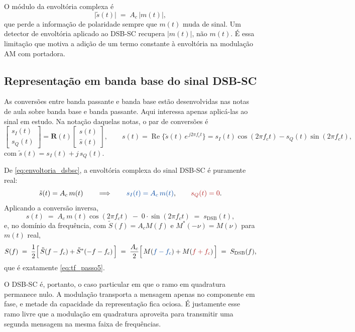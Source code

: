 \documentclass[11pt,a4paper]{article}
\newcommand{\DSB}{\text{DSB}}
\begin{document}
\begin{observacao}
O módulo da envoltória complexa é
\[
  \bigl|\tilde{s}(t)\bigr| \;=\; A_c\,\bigl|m(t)\bigr| ,
\]
que perde a informação de polaridade sempre que $m(t)$ muda de sinal. Um detector de envoltória aplicado ao DSB-SC recupera $|m(t)|$, não $m(t)$. É essa limitação que motiva a adição de um termo constante à envoltória na modulação AM com portadora.
\end{observacao}


\subsection{Representação em banda base do sinal DSB-SC}

As conversões entre banda passante e banda base estão desenvolvidas nas notas de aula sobre banda base e banda passante. Aqui interessa apenas aplicá-las ao sinal em estudo. Na notação daquelas notas, o par de conversões é
\begin{equation}
  \begin{bmatrix} s_I(t) \\[0.3em] s_Q(t) \end{bmatrix}
  = \mathbf{R}(t)\begin{bmatrix} s(t) \\[0.3em] \hat{s}(t) \end{bmatrix},
  \qquad
  s(t) = \operatorname{Re}\bigl\{\tilde{s}(t)\,e^{\,j2\pi f_c t}\bigr\}
       = s_I(t)\cos(2\pi f_c t) - s_Q(t)\sin(2\pi f_c t),
  \label{eq:conversoes_ref}
\end{equation}
com $\tilde{s}(t) = s_I(t) + j\,s_Q(t)$.

\begin{quadro}
De \eqref{eq:envoltoria_dsbsc}, a envoltória complexa do sinal DSB-SC é puramente real:
\[
  \tilde{s}(t) = A_c\, m(t)
  \qquad\Longrightarrow\qquad
  \textcolor{azul}{s_I(t) = A_c\, m(t)}, \qquad \textcolor{vermelho}{s_Q(t) = 0} .
\]
Aplicando a conversão inversa,
\[
  s(t) \;=\; A_c\, m(t)\cos(2\pi f_c t) \;-\; 0\cdot\sin(2\pi f_c t) \;=\; s_{\DSB}(t),
\]
e, no domínio da frequência, com $\tilde{S}(f) = A_c M(f)$ e $M^{*}(-\nu) = M(\nu)$ para $m(t)$ real,
\[
  S(f) \;=\; \frac{1}{2}\Bigl[\,\tilde{S}(f-f_c) + \tilde{S}^{*}(-f-f_c)\,\Bigr]
       \;=\; \frac{A_c}{2}\Bigl[\, M(\textcolor{azul}{f-f_c}) + M(\textcolor{vermelho}{f+f_c}) \,\Bigr]
       \;=\; S_{\DSB}(f),
\]
que é exatamente \eqref{eq:tf_passo5}.
\end{quadro}

O DSB-SC é, portanto, o caso particular em que o ramo em quadratura permanece nulo. A modulação transporta a mensagem apenas no componente em fase, e metade da capacidade da representação fica ociosa. É justamente esse ramo livre que a modulação em quadratura aproveita para transmitir uma segunda mensagem na mesma faixa de frequências.
\end{document}
